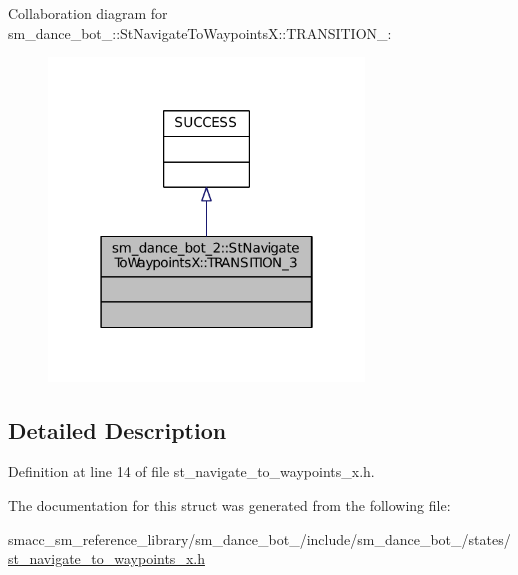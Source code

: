 Collaboration diagram for sm\+\_\+dance\+\_\+bot\+\_\+:\+:St\+Navigate\+To\+WaypointsX\+:\+:T\+R\+A\+N\+S\+I\+T\+I\+O\+N\+\_\+:
\nopagebreak
\begin{figure}[H]
\begin{center}
\leavevmode
\includegraphics[width=238pt]{structsm__dance__bot__2_1_1StNavigateToWaypointsX_1_1TRANSITION__3__coll__graph}
\end{center}
\end{figure}


\subsection{Detailed Description}


Definition at line 14 of file st\+\_\+navigate\+\_\+to\+\_\+waypoints\+\_\+x.\+h.



The documentation for this struct was generated from the following file\+:\begin{DoxyCompactItemize}
\item 
smacc\+\_\+sm\+\_\+reference\+\_\+library/sm\+\_\+dance\+\_\+bot\+\_/include/sm\+\_\+dance\+\_\+bot\+\_/states/\hyperlink{2_2include_2sm__dance__bot__2_2states_2st__navigate__to__waypoints__x_8h}{st\+\_\+navigate\+\_\+to\+\_\+waypoints\+\_\+x.\+h}\end{DoxyCompactItemize}
